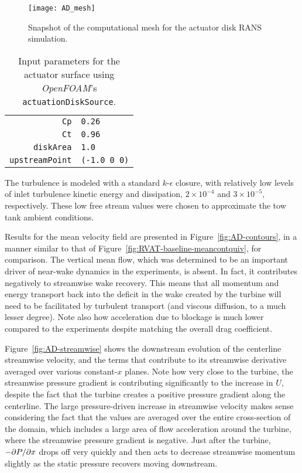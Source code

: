 \begin{figure}
    \centering

    \texttt{[image: AD\_mesh]}

    \caption{Snapshot of the computational mesh for the actuator disk RANS
        simulation.}
    
    \label{fig:AD-mesh}
\end{figure}

\begin{table}
    \begin{center}
        \begin{tabular}{r|l}
            \texttt{Cp} & \texttt{0.26} \\ 
            \texttt{Ct} & \texttt{0.96} \\ 
            \texttt{diskArea} & \texttt{1.0} \\ 
            \texttt{upstreamPoint} & \texttt{(-1.0 0 0)} \\ 
        \end{tabular} 
        \caption{Input parameters for the actuator surface using \textit{OpenFOAM}'s
            \texttt{actuationDiskSource}.}
    \label{tab:AS}
    \end{center}
\end{table}

The turbulence is modeled with a standard $k$-$\epsilon$ closure, with
relatively low levels of inlet turbulence kinetic energy and dissipation, $2
\times 10^{-4}$ and $3 \times 10^{-5}$, respectively. These low free stream
values were chosen to approximate the tow tank ambient conditions.

Results for the mean velocity field are presented in
Figure~\ref{fig:AD-contours}, in a manner similar to that of
Figure~\ref{fig:RVAT-baseline-meancontquiv}, for comparison. The vertical mean
flow, which was determined to be an important driver of near-wake dynamics in
the experiments, is absent. In fact, it contributes negatively to streamwise
wake recovery. This means that all momentum and energy transport back into the
deficit in the wake created by the turbine will need to be facilitated by
turbulent transport (and viscous diffusion, to a much lesser degree). Note also
how acceleration due to blockage is much lower compared to the experiments
despite matching the overall drag coefficient.

Figure~\ref{fig:AD-streamwise} shows the downstream evolution of the centerline
streamwise velocity, and the terms that contribute to its streamwise derivative
averaged over various constant-$x$ planes. Note how very close to the turbine,
the streamwise pressure gradient is contributing significantly to the increase
in $U$, despite the fact that the turbine creates a positive pressure gradient
along the centerline. The large pressure-driven increase in streamwise velocity
makes sense considering the fact that the values are averaged over the entire
cross-section of the domain, which includes a large area of flow acceleration
around the turbine, where the streamwise pressure gradient is negative. Just
after the turbine, $-\partial P / \partial x$ drops off very quickly and then acts to
decrease streamwise momentum slightly as the static pressure recovers moving
downstream.

